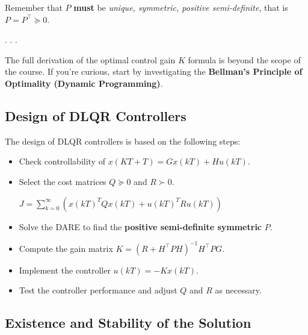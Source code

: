 \documentclass[
  letterpaper,
  DIV=11,
  numbers=noendperiod,
  oneside]{scrartcl}
\begin{document}
Remember that \(P\) \textbf{must} be \emph{unique, symmetric, positive
semi-definite}, that is \(P=P^\intercal\succeq 0\).

. . .

\begin{tcolorbox}[enhanced jigsaw, rightrule=.15mm, coltitle=black, titlerule=0mm, breakable, title=\textcolor{quarto-callout-note-color}{\faInfo}\hspace{0.5em}{Note}, bottomrule=.15mm, colback=white, toprule=.15mm, opacityback=0, opacitybacktitle=0.6, leftrule=.75mm, left=2mm, colbacktitle=quarto-callout-note-color!10!white, bottomtitle=1mm, toptitle=1mm, arc=.35mm, colframe=quarto-callout-note-color-frame]

The full derivation of the optimal control gain \(K\) formula is beyond
the scope of the course. If you're curious, start by investigating the
\textbf{Bellman's Principle of Optimality (Dynamic Programming)}.

\end{tcolorbox}

\subsection{Design of DLQR
Controllers}\label{design-of-dlqr-controllers}

The design of DLQR controllers is based on the following steps:

\begin{itemize}
\item
  Check controllability of \(x(KT+T) = Gx(kT) + Hu(kT)\).
\item
  Select the cost matrices \(Q\succeq 0\) and \(R\succ 0\).

  \(J = \sum_{k=0}^{\infty} \left( x(kT)^T Q x(kT) + u(kT)^T R u(kT) \right)\)
\item
  Solve the DARE to find the \textbf{positive semi-definite symmetric}
  \(P\).
\item
  Compute the gain matrix
  \(K = (R + H^\intercal P H)^{-1} H^\intercal P G\).
\item
  Implement the controller \(u(kT) = -Kx(kT)\).
\item
  Test the controller performance and adjust \(Q\) and \(R\) as
  necessary.
\end{itemize}

\subsection{Existence and Stability of the
Solution}\label{existence-and-stability-of-the-solution}
\end{document}
